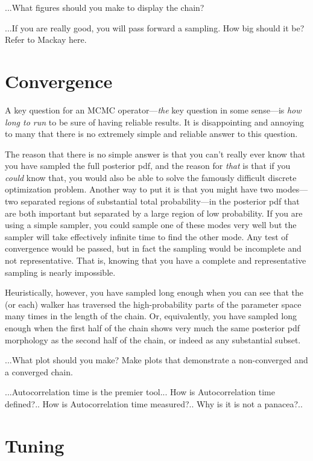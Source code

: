 \documentclass[12pt,twoside,pdftex]{article}
\begin{document}
...What figures should you make to display the chain?

...If you are really good, you will pass forward a sampling.  How big
should it be?  Refer to Mackay here.

\section{Convergence}

A key question for an MCMC operator---\emph{the} key question in some
sense---is \emph{how long to run} to be sure of having reliable
results.
It is disappointing and annoying to many that there is no extremely
simple and reliable answer to this question.

The reason that there is no simple answer is that you can't really
ever know that you have sampled the full posterior pdf, and the reason
for \emph{that} is that if you \emph{could} know that, you would also
be able to solve the famously difficult discrete optimization
problem.
Another way to put it is that you might have two modes---two separated
regions of substantial total probability---in the posterior pdf that
are both important but separated by a large region of low probability.
If you are using a simple sampler, you could sample one of these modes
very well but the sampler will take effectively infinite time to find
the other mode.
Any test of convergence would be passed, but in fact the sampling
would be incomplete and not representative.
That is, knowing that you have a complete and representative sampling
is nearly impossible.

Heuristically, however, you have sampled long enough when you can see
that the (or each) walker has traversed the high-probability parts of
the parameter space many times in the length of the chain.
Or, equivalently, you have sampled long enough when the first half of
the chain shows very much the same posterior pdf morphology as the
second half of the chain, or indeed as any substantial subset.

...What plot should you make?  Make plots that demonstrate a non-converged and a converged chain.

...Autocorrelation time is the premier tool...
How is Autocorrelation time defined?..
How is Autocorrelation time measured?..
Why is it is not a panacea?..

\section{Tuning}
\end{document}
